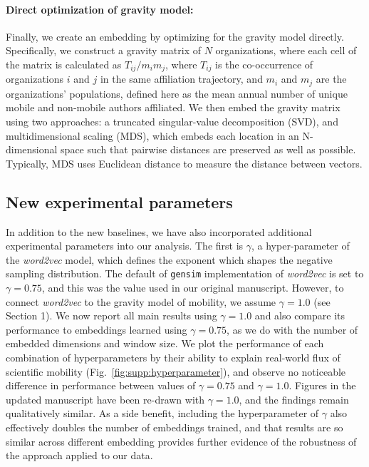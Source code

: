 \documentclass[12pt,draft,a4paper]{article}
\begin{document}
\vspace{-0.3cm}
\paragraph{Direct optimization of gravity model:} Finally, we create an embedding by optimizing for the gravity model directly.
Specifically, we construct a gravity matrix of $N$ organizations, where each cell of the matrix is calculated as $T_{ij}/m_i m_j$, where $T_{ij}$ is the co-occurrence of organizations $i$ and $j$ in the same affiliation trajectory, and $m_i$ and $m_j$ are the organizations' populations, defined here as the mean annual number of unique mobile and non-mobile authors affiliated. We then embed the gravity matrix using two approaches: a truncated singular-value decomposition (SVD), and multidimensional scaling (MDS), which embeds each location in an N-dimensional space such that pairwise distances are preserved as well as possible.
Typically, MDS uses Euclidean distance to measure the distance between vectors.

\subsection{New experimental parameters}
In addition to the new baselines, we have also incorporated additional experimental parameters into our analysis.
The first is $\gamma$, a hyper-parameter of the \textit{word2vec} model, which defines the exponent which shapes the negative sampling distribution.
The default of \texttt{gensim} implementation of \textit{word2vec} is set to $\gamma = 0.75$, and this was the value used in our original manuscript.
However, to connect \textit{word2vec} to the gravity model of mobility, we assume $\gamma = 1.0$ (see Section 1).
We now report all main results using $\gamma = 1.0$ and also compare its performance to embeddings learned using $\gamma = 0.75$, as we do with the number of embedded dimensions and window size.
We plot the performance of each combination of hyperparameters by their ability to explain real-world flux of scientific mobility (Fig.~\ref{fig:supp:hyperparameter}), and observe no noticeable difference in performance between values of $\gamma = 0.75$ and $\gamma = 1.0$.
Figures in the updated manuscript have been re-drawn with $\gamma = 1.0$, and the findings remain qualitatively similar.
As a side benefit, including the hyperparameter of $\gamma$ also effectively doubles the number of embeddings trained, and that results are so similar across different embedding provides further evidence of the robustness of the approach applied to our data.
\end{document}
